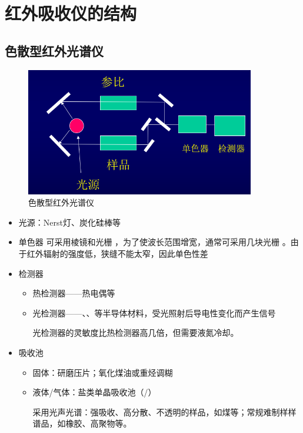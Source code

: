 \section{红外吸收仪的结构}
\subsection{色散型红外光谱仪}
\begin{figure}[ht]
	\centering
	\includegraphics[width=10cm]{image/chp5_ord_ins.png}
	\caption{色散型红外光谱仪}
	\label{fig:ordin_ins}
\end{figure}
\begin{itemize}

	\item 光源：Nerst灯、炭化硅棒等
	\item 单色器
	可采用棱镜和光栅
	，为了使波长范围增宽，通常可采用几块光栅
	。由于红外辐射的强度低，狭缝不能太窄，因此单色性差
	\item 检测器
	\begin{itemize}
		\item 热检测器——热电偶等
		\item 光检测器——、、等半导体材料，受光照射后导电性变化而产生信号
		\begin{note}
			光检测器的灵敏度比热检测器高几倍，但需要液氮冷却。
		\end{note}
	\end{itemize}
	\item  吸收池
	\begin{itemize}
		\item 固体：研磨压片；氧化煤油或重烃调糊
		\item 液体/气体：盐类单晶吸收池（/）
		\begin{note}
			采用光声光谱：强吸收、高分散、不透明的样品，如煤等；常规难制样样
			谱品，如橡胶、高聚物等。
		\end{note}
	\end{itemize}
\end{itemize}

